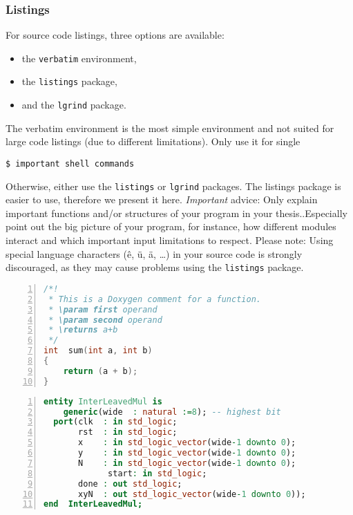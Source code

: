 \subsubsection{Listings}
For source code listings, three options are available:
\begin{itemize}
\item the \texttt{verbatim} environment,
\item the \texttt{listings} package,
\item and the \texttt{lgrind} package.
\end{itemize}

The verbatim environment is the most simple environment and not suited for large code listings (due to different limitations). Only use it for single

\begin{verbatim}
$ important shell commands
\end{verbatim}

Otherwise, either use the \texttt{listings} or \texttt{lgrind} packages. The listings package is easier to use, therefore we present it here. \emph{Important} advice: Only explain important functions and/or structures of your program in your thesis..Especially point out the big picture of your program, for instance, how different modules interact and which important input limitations to respect. Please note: Using special language characters (\^{e},\/ \"{u},\/ \"{a}, \dots) in your source code is strongly discouraged, as they may cause problems using the \texttt{listings} package.

\begin{lstlisting}[language={C}, caption={A sample listing of a C function. Description of the function is here. Please note that different languages are available.}, numbers=left]
/*!
 * This is a Doxygen comment for a function.
 * \param first operand
 * \param second operand
 * \returns a+b
 */
int  sum(int a, int b)
{
	return (a + b);
}
\end{lstlisting}

\begin{lstlisting}[language={VHDL}, caption={A sample listing of a VHDL entity. Description of the entity is here. Please note that different languages are available.}, numbers=left]
entity InterLeavedMul is
	generic(wide  : natural :=8); -- highest bit
  port(clk  : in std_logic;
       rst  : in std_logic;
       x    : in std_logic_vector(wide-1 downto 0);
       y    : in std_logic_vector(wide-1 downto 0);
       N    : in std_logic_vector(wide-1 downto 0);
			 start: in std_logic;
       done : out std_logic;
       xyN  : out std_logic_vector(wide-1 downto 0));
end  InterLeavedMul;
\end{lstlisting}

